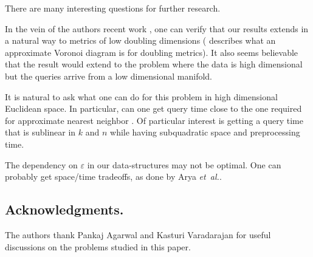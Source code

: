 \documentclass[12pt]{article}
\theoremstyle{remark}{\theorembodyfont{\rm} \newtheorem{remark}[theorem]{Remark}}
\newcommand{\eps}{{\varepsilon}}\newcommand{\divides}{|}
\newcommand{\etal}{\textit{et~al.}\xspace}
\begin{document}
There are many interesting questions for further research.
\begin{compactenum}[\qquad (A)]
    \item In the vein of the authors recent work \cite{hk-annsl-11},
    one can verify that our results extends in a natural way
    to metrics of low doubling dimensions (\cite{hk-annsl-11}
    describes what an approximate Voronoi diagram is for doubling
    metrics). It also seems believable that the result would extend to
    the problem where the data is high dimensional but the queries
    arrive from a low dimensional manifold.
    
    \item It is natural to ask what one can do for this problem in
    high dimensional Euclidean space. In particular, can one get query
    time close to the one required for approximate nearest neighbor
    \cite{im-anntr-98, him-anntr-12}. Of particular interest is getting a query time
    that is sublinear in $k$ and $n$ while having subquadratic space
    and preprocessing time.
    
    \item The dependency on $\eps$ in our data-structures may
    not be optimal. One can probably get space/time tradeoffs, as done by
    Arya \etal \cite{amm-sttan-09}.
\end{compactenum}


\subsection*{Acknowledgments.}

The authors thank Pankaj Agarwal and Kasturi Varadarajan for useful
discussions on the problems studied in this paper.







\end{document}
